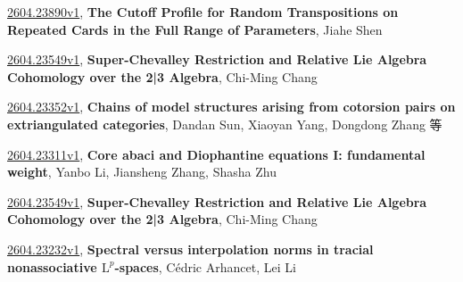 \documentclass[9pt, a4paper]{article}
\theoremstyle{plain}
\theoremstyle{definition}
\theoremstyle{remark}
\newcommand{\arxiv}[3]{\href{https://arxiv.org/abs/#1}{#1}, \textbf{\textcolor{arxivblue}{#2}}, #3}
\begin{document}
\arxiv{2604.23890v1}{The Cutoff Profile for Random Transpositions on Repeated Cards in the Full Range of Parameters}{Jiahe Shen}

\arxiv{2604.23549v1}{Super-Chevalley Restriction and Relative Lie Algebra Cohomology over the 2|3 Algebra}{Chi-Ming Chang}

\arxiv{2604.23352v1}{Chains of model structures arising from cotorsion pairs on extriangulated categories}{Dandan Sun, Xiaoyan Yang, Dongdong Zhang 等}

\arxiv{2604.23311v1}{Core abaci and Diophantine equations I: fundamental weight}{Yanbo Li, Jiansheng Zhang, Shasha Zhu}

\arxiv{2604.23549v1}{Super-Chevalley Restriction and Relative Lie Algebra Cohomology over the 2|3 Algebra}{Chi-Ming Chang}

\arxiv{2604.23232v1}{Spectral versus interpolation norms in tracial nonassociative $\mathrm{L}^p$-spaces}{Cédric Arhancet, Lei Li}

\end{document}

